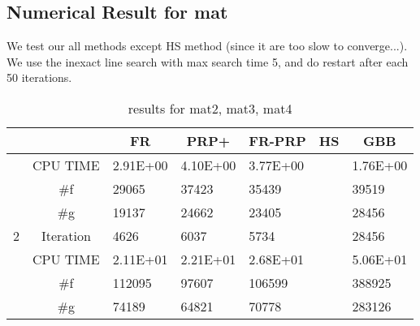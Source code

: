\documentclass{article}
\begin{document}
\subsection{Numerical Result for mat}
We test our all methods except HS method (since it are too slow to converge...). We use the inexact line search with max search time 5, and do restart after each 50 iterations.
\begin{table}[H]
	\centering
	\caption{results for mat2, mat3, mat4}
	\begin{tabular}{|c|c|l|l|l|l|l|}
		\hline
		&           & \multicolumn{1}{c|}{FR}         & \multicolumn{1}{c|}{PRP+}       & \multicolumn{1}{c|}{FR-PRP}     & \multicolumn{1}{c|}{HS} & \multicolumn{1}{c|}{GBB}          \\ \hline
		& CPU TIME  & {\color[HTML]{000000} 2.91E+00} & {\color[HTML]{000000} 4.10E+00} & {\color[HTML]{000000} 3.77E+00} & {\color[HTML]{000000} } & {\color[HTML]{000000} 1.76E+00}   \\ \cline{2-7} 
		& \#f       & {\color[HTML]{000000} 29065}    & {\color[HTML]{000000} 37423}    & {\color[HTML]{000000} 35439}    & {\color[HTML]{000000} } & {\color[HTML]{000000} 39519}      \\ \cline{2-7} 
		& \#g       & {\color[HTML]{000000} 19137}    & {\color[HTML]{000000} 24662}    & {\color[HTML]{000000} 23405}    & {\color[HTML]{000000} } & {\color[HTML]{000000} 28456}      \\ \cline{2-7} 
		\multirow{-4}{*}{2} & Iteration & {\color[HTML]{000000} 4626}     & {\color[HTML]{000000} 6037}     & {\color[HTML]{000000} 5734}     & {\color[HTML]{000000} } & {\color[HTML]{000000} 28456}      \\ \hline
		& CPU TIME  & {\color[HTML]{000000} 2.11E+01} & {\color[HTML]{000000} 2.21E+01} & {\color[HTML]{000000} 2.68E+01} & {\color[HTML]{000000} } & {\color[HTML]{000000} 5.06E+01}   \\ \cline{2-7} 
		& \#f       & {\color[HTML]{000000} 112095}   & {\color[HTML]{000000} 97607}    & {\color[HTML]{000000} 106599}   & {\color[HTML]{000000} } & {\color[HTML]{000000} 388925}     \\ \cline{2-7} 
		& \#g       & {\color[HTML]{000000} 74189}    & {\color[HTML]{000000} 64821}    & {\color[HTML]{000000} 70778}    & {\color[HTML]{000000} } & {\color[HTML]{000000} 283126}     \\ \cline{2-7} 

\end{tabular}
\end{table}
\end{document}
